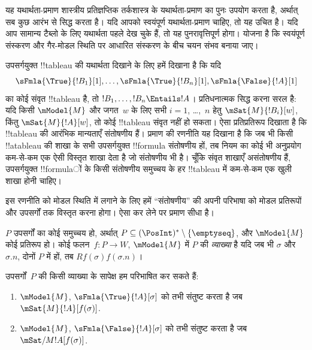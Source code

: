 \documentclass[../../../include/open-logic-section]{subfiles}
\begin{document}


\begin{editorial}
  यह यथार्थता-प्रमाण शास्त्रीय प्रतिज्ञप्तिक तर्कशास्त्र के यथार्थता-प्रमाण
  का पुनः उपयोग करता है, अर्थात् सब कुछ आरंभ से सिद्ध करता है। यदि आपको
  स्वयंपूर्ण यथार्थता-प्रमाण चाहिए, तो यह उचित है। यदि आप सामान्य टैब्लो
  के लिए यथार्थता पहले देख चुके हैं, तो यह पुनरावृत्तिपूर्ण होगा। योजना है
  कि स्वयंपूर्ण संस्करण और गैर-मोडल स्थिति पर आधारित संस्करण के बीच चयन
  संभव बनाया जाए।
\end{editorial}

\begin{explain}
  उपसर्गयुक्त !!{tableau} की यथार्थता दिखाने के लिए हमें दिखाना है कि यदि
  \[
  \sFmla{\True}{!B_1}[1], \dots, \sFmla{\True}{!B_n}[1], \sFmla{\False}{!A}[1]
  \]
  का कोई संवृत !!{tableau} है, तो $!B_1, \dots, !B_n \Entails !A$।
  प्रतिधनात्मक सिद्ध करना सरल है: यदि किसी $\mModel{M}$ और जगत~$w$ के
  लिए सभी $i=1$, \dots,~$n$ हेतु $\mSat{M}{!B_i}[w]$, किंतु
  $\mSat{M}{!A}[w]$, तो कोई !!{tableau} संवृत नहीं हो सकता। ऐसा
  प्रतिप्रतिरूप दिखाता है कि !!{tableau} की आरंभिक मान्यताएँ संतोषणीय हैं।
  प्रमाण की रणनीति यह दिखाना है कि जब भी किसी !!a{tableau} की शाखा के सभी
  उपसर्गयुक्त !!{formula} संतोषणीय हों, तब नियम का कोई भी अनुप्रयोग कम-से-कम
  एक ऐसी विस्तृत शाखा देता है जो संतोषणीय भी है। चूँकि संवृत शाखाएँ
  असंतोषणीय हैं, उपसर्गयुक्त !!{formula}ों के किसी संतोषणीय समुच्चय के हर
  !!{tableau} में कम-से-कम एक खुली शाखा होनी चाहिए।

  इस रणनीति को मोडल स्थिति में लगाने के लिए हमें ``संतोषणीय'' की अपनी
  परिभाषा को मोडल प्रतिरूपों और उपसर्गों तक विस्तृत करना होगा। ऐसा कर लेने
  पर प्रमाण सीधा है।
\end{explain}

\begin{defn}
  $P$ उपसर्गों का कोई समुच्चय हो, अर्थात् $P \subseteq (\PosInt)^*
  \setminus \{\emptyseq\}$, और $\mModel{M}$ कोई प्रतिरूप हो। कोई
  फलन~$f\colon P \to W$, $\mModel{M}$ में $P$ की \emph{व्याख्या} है यदि
  जब भी $\sigma$ और $\sigma.n$, दोनों $P$ में हों, तब
  $Rf(\sigma)f(\sigma.n)$।

  उपसर्गों~$P$ की किसी व्याख्या के सापेक्ष हम परिभाषित कर सकते हैं:
  \begin{enumerate}
  \item $\mModel{M}$, $\sFmla{\True}{!A}[\sigma]$ को तभी संतुष्ट करता है जब
    $\mSat{M}{!A}[f(\sigma)]$.
  \item $\mModel{M}$, $\sFmla{\False}{!A}[\sigma]$ को तभी संतुष्ट करता है जब
    $\mSat/{M}{!A}[f(\sigma)]$.
  \end{enumerate}
\end{defn}
\end{document}
